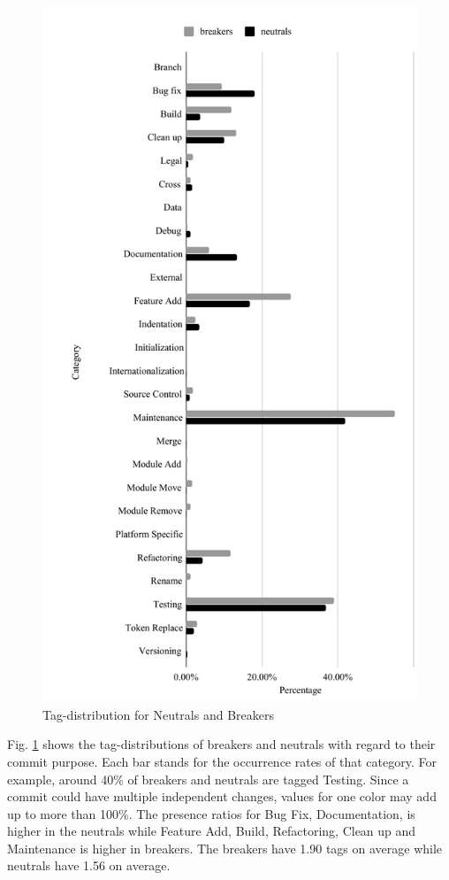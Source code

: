 \begin{figure}[htbp]
\centerline{\includegraphics[scale=0.5]{figures/breaker_neutral.pdf}}
\caption{Tag-distribution for Neutrals and Breakers}
\label{fig:breaker_neutral_distribution}
\end{figure}

Fig. \ref{fig:breaker_neutral_distribution} shows the tag-distributions of breaker{}s and neutral{}s with regard to their commit purpose.
Each bar stands for the occurrence rates of that category. 
For example, around 40\% of breaker{}s and neutral{}s are tagged Testing. 
Since a commit could have multiple independent changes, values for one color may add up to more than 100\%.
The presence ratios for Bug Fix, Documentation, is higher in the neutrals while Feature Add, Build, Refactoring, Clean up and Maintenance is higher in breaker{}s.
The breaker{}s have 1.90 tags on average while neutral{}s have 1.56 on average.


